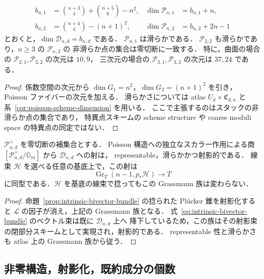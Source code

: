 \begin{corollary}[次元と滑らかな部分]
\label{cor:moduli-dimension}
\begin{align*}
 b_{n,1}&=\binom{n+3}{4}+\binom{n+5}{6}-n^2,&
 \dim\mathcal P_{n,1}&=b_{n,1}+n,\\
 b_{n,2}&=\binom{n+4}{4}-(n+1)^2,&
 \dim\mathcal P_{n,2}&=b_{n,2}+2n-1
\end{align*}
とおくと，$\dim\mathcal D_{n,d}=b_{n,d}$ である．
$\mathcal P_{n,1}$ は滑らかである．
$\mathcal P_{2,2}$ も滑らかであり，$n\geq3$ の $\mathcal P_{n,2}$ の
非滑らか点の集合は零切断に一致する．
特に，曲面の場合の $\mathcal P_{2,1},\mathcal P_{2,2}$ の次元は $10,9$，
三次元の場合の $\mathcal P_{3,1},\mathcal P_{3,2}$ の次元は $37,24$ である．
\end{corollary}

\begin{proof}
係数空間の次元から $\dim G_1=n^2$，$\dim G_2=(n+1)^2$ を引き，
Poisson ファイバーの次元を加える．
滑らかさについては atlas $U_d\times \mathfrak C_{d,n}$ と
系~\ref{cor:poisson-scheme-dimension} を用いる．
ここで主張するのはスタックの非滑らか点の集合であり，
特異点スキームの scheme structure や coarse moduli space の特異点の同定ではない．
\end{proof}

\begin{corollary}
\label{cor:projective-moduli}
$\mathcal P_{n,d}^{\times}$ を零切断の補集合とする．
Poisson 構造への独立なスカラー作用による商
$[\mathcal P_{n,d}^{\times}/\mathbb G_m]$ から $\mathcal D_{n,d}$ への射は，
representable，滑らかかつ射影的である．
線束 $\mathcal H$ を選べる任意の基底上で，この射は
\[
 \operatorname{Gr}_T(n-1,p_*\mathcal H)\longrightarrow T
\]
に同型である．$\mathcal H$ を基底の線束で捻ってもこの Grassmann 族は変わらない．
\end{corollary}

\begin{proof}
命題~\ref{prop:intrinsic-bivector-bundle} の捻られた Pl\"ucker 錐を射影化すると
$\mathcal L$ の因子が消え，上記の Grassmann 族となる．
式~\eqref{eq:intrinsic-bivector-bundle} のベクトル束は既に $\mathcal D_{n,d}$ 上へ
降下しているため，この族はその射影束の閉部分スキームとして実現され，射影的である．
representable 性と滑らかさも atlas 上の Grassmann 族から従う．
\end{proof}

\subsection{非零構造，射影化，既約成分の個数}

